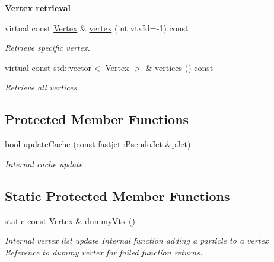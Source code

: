 \begin{Indent}{\bf Vertex retrieval}\par
\begin{CompactItemize}
\item 
virtual const \hyperlink{classVertex}{Vertex} \& \hyperlink{classEvent_70086b70f2ace2dc6e04f48dd7f6eb0a}{vertex} (int vtx\-Id=-1) const 
\begin{CompactList}\small\item\em Retrieve specific vertex. \item\end{CompactList}\item 
virtual const std::vector$<$ \hyperlink{classVertex}{Vertex} $>$ \& \hyperlink{classEvent_ec6d4e1ebf6de2650abd8058674a621c}{vertices} () const 
\begin{CompactList}\small\item\em Retrieve all vertices. \item\end{CompactList}\end{CompactItemize}
\end{Indent}
\subsection*{Protected Member Functions}
\begin{CompactItemize}
\item 
\hypertarget{classEvent_e6ea46c141347bb254bc1b7e374bd889}{
bool \hyperlink{classEvent_e6ea46c141347bb254bc1b7e374bd889}{update\-Cache} (const fastjet::Pseudo\-Jet \&p\-Jet)}
\label{classEvent_e6ea46c141347bb254bc1b7e374bd889}

\begin{CompactList}\small\item\em Internal cache update. \item\end{CompactList}\end{CompactItemize}
\subsection*{Static Protected Member Functions}
\begin{CompactItemize}
\item 
\hypertarget{classEvent_b66d3957aee39832e7d50a9f4a8cc456}{
static const \hyperlink{classVertex}{Vertex} \& \hyperlink{classEvent_b66d3957aee39832e7d50a9f4a8cc456}{dummy\-Vtx} ()}
\label{classEvent_b66d3957aee39832e7d50a9f4a8cc456}

\begin{CompactList}\small\item\em Internal vertex list update Internal function adding a particle to a vertex Reference to dummy vertex for failed function returns. \item\end{CompactList}\end{CompactItemize}
